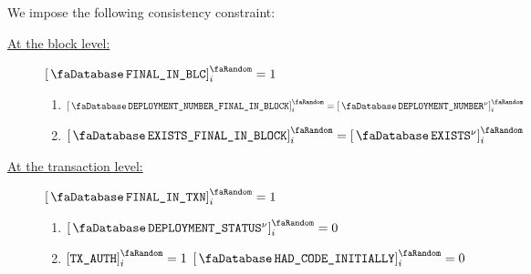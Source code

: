 We impose the following consistency constraint:
\begin{description}
	\item[\underline{At the block level:}]
		\If $\accFinalInBlock _{i} = 1$ \Then
		\begin{enumerate}
			\item $\order{\accDeploymentNumberFinalInBlock} _{i} = \order{\accDeploymentNumber\new} _{i}$
			\item $\order{\accExistenceFinalInBlock}        _{i} = \order{\accExists\new}           _{i}$
		\end{enumerate}
		\item[\underline{At the transaction level:}]
			\If $\accFinalInTransaction _{i} = 1$ \Then
		\begin{enumerate}
			\item $\order{\accDeploymentStatus\new} _{i} = 0$
			\item\label{hub: consistency: account: setting "account had code initially" if this account only exists in TXAUTH rows}
				\If $\order{\txAuth} _{i} = 1$ \Then $\order{\accHadCodeInitially} _{i} = 0$
		\end{enumerate}
\end{description}
